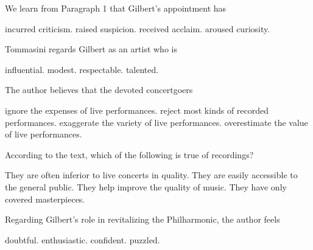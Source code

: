 \item We learn from Paragraph 1 that Gilbert's appointment has
\begin{tasks}
	\task incurred criticism.
	\task raised suspicion.
	\task received acclaim.
	\task aroused curiosity.
\end{tasks}
\item Tommasini regards Gilbert as an artist who is
\begin{tasks}
	\task influential.
	\task modest.
	\task respectable.
	\task talented.
\end{tasks}
\item The author believes that the devoted concertgoers
\begin{tasks}
	\task ignore the expenses of live performances.
	\task reject most kinds of recorded performances.
	\task exaggerate the variety of live performances.
	\task overestimate the value of live performances.
\end{tasks}
\item According to the text, which of the following is true of recordings?
\begin{tasks}
	\task They are often inferior to live concerts in quality.
	\task They are easily accessible to the general public.
	\task They help improve the quality of music.
	\task They have only covered masterpieces.
\end{tasks}
\item Regarding Gilbert's role in revitalizing the Philharmonic, the author feels
\begin{tasks}
	\task doubtful.
	\task enthusiastic.
	\task confident.
	\task puzzled.
\end{tasks}